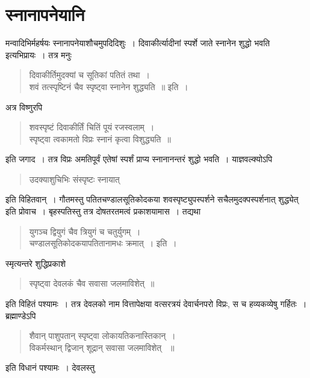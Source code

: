 {\section*{स्नानापनेयानि}

मन्वादिभिर्महर्षयः स्नानापनेयाशौचमुपदिदिशुः~। दिवाकीर्त्यादीनां स्पर्शे जाते स्नानेन शुद्धो भवति इत्यभिप्रायः~। तत्र मनुः \enginline{-}
\begin{verse}
दिवाकीर्तिमुदक्यां च सूतिकां पतितं तथा~। \\
शवं तत्स्पृष्टिनं चैव स्पृष्ट्वा स्नानेन शुद्ध्यति~॥ इति~। 
\end{verse}
अत्र विष्णुरपि \enginline{-}
\begin{verse}
शवस्पृष्टं दिवाकीर्तिं चितिं पूयं रजस्वलाम्~। \\
स्पृष्ट्वा त्वकामतो विप्रः स्नानं कृत्वा विशुद्ध्यति~॥ 
\end{verse}
इति जगाद~। तत्र विप्रः अमतिपूर्वं एतेषां स्पर्शं प्राप्य स्नानानन्तरं शुद्धो भवति~। याज्ञवल्क्योऽपि \enginline{-}
\begin{verse}
उदक्याशुचिभिः संस्पृष्टः स्नायात् \enginline{-}
\end{verse}
इति विहितवान्~। गौतमस्तु \enginline{-} 
पतितचण्डालसूतिकोदकया शवस्पृष्ट्युपस्पर्शने सचैलमुदक्पस्पर्शनात् शुद्ध्येत् इति प्रोवाच~। बृहस्पतिस्तु तत्र दोषतरतमत्वं प्रकाशयामास~। तद्यथा \enginline{-}
\begin{verse}
युगञ्च द्वियुगं चैव त्रियुगं च चतुर्युगम्~। \\
चण्डालसूतिकोदकयापतितानामधः क्रमात्~। इति~। 
\end{verse}
स्मृत्यन्तरे शुद्धिप्रकाशे \enginline{-}
\begin{verse}
स्पृष्ट्वा देवलकं चैव सवासा जलमाविशेत्~॥
\end{verse}
इति विहितं पश्यामः~। तत्र देवलको नाम वित्तापेक्षया वत्सरत्रयं देवार्चनपरो विप्रः, स च हव्यकव्येषु गर्हितः~। ब्रह्माण्डेऽपि \enginline{-}
\begin{verse}
शैवान् पाशुपतान् स्पृष्ट्वा लोकायतिकनास्तिकान्~। \\
विकर्मस्थान् द्विजान् शूद्रान् सवासा जलमाविशेत् ~॥ 
\end{verse}
इति विधानं पश्यामः~।  देवलस्तु \enginline{-}

}
